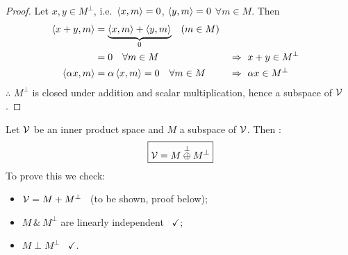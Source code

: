 \begin{claim}
\end{claim}
\begin{proof}
Let $x,y\in M^\perp$, i.e.\ $\left\langle x, m \right\rangle=0$, $\left\langle y, m \right\rangle=0$ $\forall m\in M$. Then
\begin{align*}
\left\langle x+y, m \right\rangle&=\underbrace{\left\langle x, m \right\rangle+\left\langle y, m \right\rangle}_{0} \quad (m\in M)\\
&=0 \quad \forall m\in M &&\Rightarrow\ x+y\in M^\perp\\
\left\langle \alpha x, m \right\rangle&=\alpha\left\langle x, m \right\rangle=0 \quad\forall m\in M &&\Rightarrow\ \alpha x\in M^\perp
\end{align*}
$\therefore$ $M^\perp$ is closed under addition and scalar multiplication, hence a subspace of $\mathcal{V}$.
\end{proof}

\begin{theorem}\leavevmode{}
Let $\mathcal{V}$ be an inner product space and $M$ a subspace of $\mathcal{V}$. Then :
\[
\boxed{\mathcal{V}=M\overset{\perp}{\oplus}M^\perp}
\]
To prove this we check:
\begin{itemize}[nosep]
\item $\mathcal{V}=M+M^\perp$ \ (to be shown, proof below);
\item $M\,\&\,M^\perp$ are linearly independent \ $\checkmark$;
\item $M\perp M^\perp$ \ $\checkmark$.
\end{itemize}
\end{theorem}

